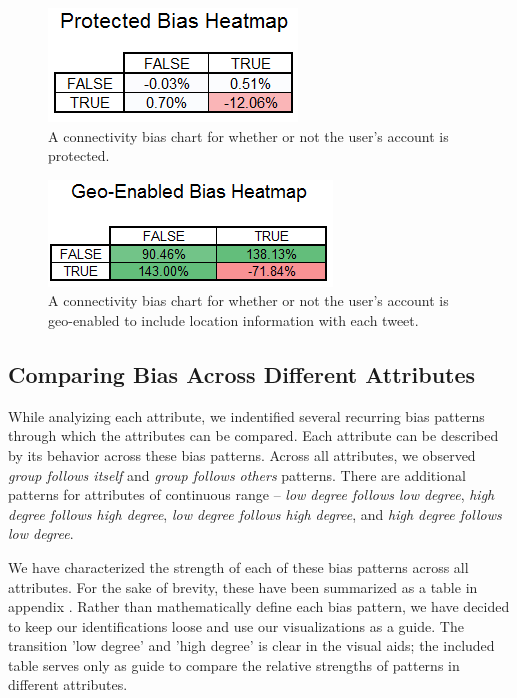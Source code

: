 \begin{figure}[t]
 \centering
 \includegraphics[bb=0 0 188 86, scale=.5]{./images/protected.png}
 \caption{A connectivity bias chart for whether or not the user's account is protected.}
 \label{fig:protected}
\end{figure}

\begin{figure}[t]
 \centering
 \includegraphics[bb=0 0 214 80, scale=.5]{./images/geoenabled.png}
 \caption{A connectivity bias chart for whether or not the user's account is geo-enabled to include location information with each tweet.}
 \label{fig:geoenabled}
\end{figure}

\subsection{Comparing Bias Across Different Attributes}
\label{sub:crossattribute}
While analyizing each attribute, we indentified several recurring bias patterns through which the attributes can be compared.  Each attribute can be described by its behavior across these bias patterns.  Across all attributes, we observed \textit{group follows itself} and \textit{group follows others} patterns.  There are additional patterns for attributes of continuous range -- \textit{low degree follows low degree}, \textit{high degree follows high degree}, \textit{low degree follows high degree}, and \textit{high degree follows low degree}.

We have characterized the strength of each of these bias patterns across all attributes.  For the sake of brevity, these have been summarized as a table in appendix \label{app:table_cross_attribute}.  Rather than mathematically define each bias pattern, we have decided to keep our identifications loose and use our visualizations as a guide.  The transition 'low degree' and 'high degree' is clear in the visual aids; the included table serves only as guide to compare the relative strengths of patterns in different attributes.